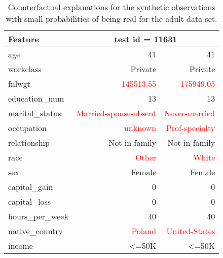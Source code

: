 \begin{table}[ht]
\centering
\begin{tabular}{|l|rr|}
  \toprule
  Feature& \multicolumn{2}{c|}{ test id = 11631}\\ \midrule
age & 41 & 41 \\ 
  workclass & Private & Private \\ 
  fnlwgt & \textcolor{red}{145513.55} & \textcolor{red}{175949.05} \\ 
  education\_num & 13 & 13 \\ 
  marital\_status & \textcolor{red}{Married-spouse-absent} & \textcolor{red}{Never-married} \\ 
  occupation & \textcolor{red}{unknown} & \textcolor{red}{Prof-specialty} \\ 
  relationship & Not-in-family & Not-in-family \\ 
  race & \textcolor{red}{Other} & \textcolor{red}{White} \\ 
  sex & Female & Female \\ 
  capital\_gain & 0 & 0 \\ 
  capital\_loss & 0 & 0 \\ 
  hours\_per\_week & 40 & 40 \\ 
  native\_country & \textcolor{red}{Poland} & \textcolor{red}{United-States} \\ 
  income & <=50K & <=50K \\ 
   \bottomrule
\end{tabular}
\caption{Counterfactual explanations for the synthetic observations with small probabilities of being real for the adult data set.} 
\end{table}
